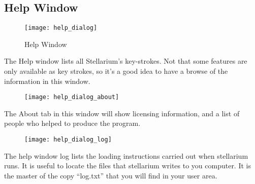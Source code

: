 \subsection{Help Window}

\begin{figure}[h]
\centering\texttt{[image: help\_dialog]}
\caption{Help Window}
\end{figure}

The Help window lists all Stellarium's key-strokes. Not that some
features are only available as key strokes, so it's a good idea to have
a browse of the information in this window.

\begin{figure}[h]
\centering\texttt{[image: help\_dialog\_about]}
\end{figure}

The About tab in this window will show licensing information, and a list
of people who helped to produce the program.

\begin{figure}[h]
\centering\texttt{[image: help\_dialog\_log]}
\end{figure}

The help window log lists the loading instructions carried out when
stellarium runs. It is useful to locate the files that stellarium writes
to you computer. It is the master of the copy ``log.txt'' that you will
find in your user area.
